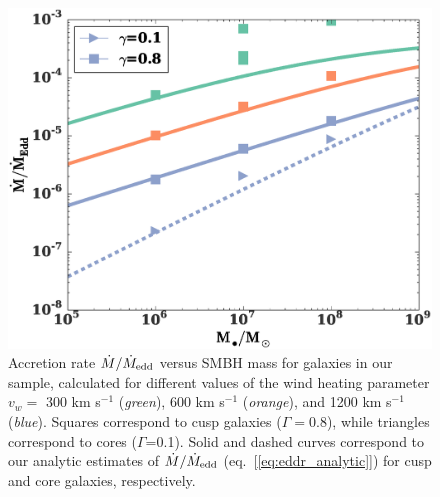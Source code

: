 \documentclass[usenatbib,fleqn]{mn2e}
\newcommand{\vwO}{v_{w}}
\begin{document}
\begin{figure}
  \includegraphics[width=\columnwidth]{mdot_mass.eps}
  \caption{\label{fig:mdot_mass} Accretion rate $\dot{M}/\dot{M}_{\rm edd}$ versus SMBH mass for galaxies in our sample, calculated for different values of the wind heating parameter $\vwO =$ 300 km s$^{-1}$ ({\it green}),
    600 km s$^{-1}$ ({\it orange}), and 1200 km s$^{-1}$ ({\it blue}).
    Squares correspond to cusp galaxies ($\Gamma=0.8$), while
    triangles correspond to cores ($\Gamma$=0.1). Solid and dashed curves correspond to our analytic estimates of $\dot{M}/\dot{M}_{\rm edd}$ (eq.~[\ref{eq:eddr_analytic}]) for cusp and core galaxies, respectively. }
\end{figure}
\end{document}
